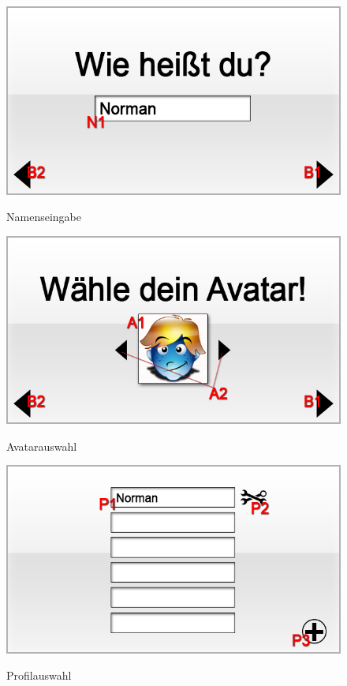 \begin{figure}[H]
\centering
{}\label{fig:Namenseingabe} 
\includegraphics[scale=0.55]
{../gui/_jpeg_numeration/registration2.jpg}
\caption{Namenseingabe}
\end{figure}

\begin{figure}[H]
\centering
{}\label{fig:Avatarauswahl}
\includegraphics[scale=0.55]{../gui/_jpeg_numeration/registration3.jpg}
\caption{Avatarauswahl}
\end{figure}

\begin{figure}[H]
\centering
{}\label{fig:Profilauswahl}
\includegraphics[scale=0.55]{../gui/_jpeg_numeration/choose_profile.jpg}
\caption{Profilauswahl}
\end{figure}


